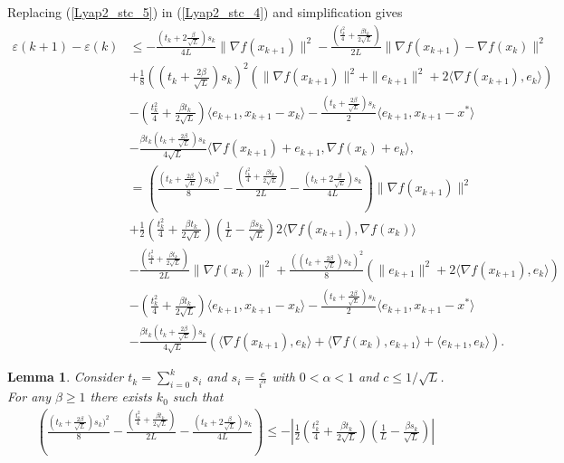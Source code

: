 \documentclass{article}
\theoremstyle{plain}
\newtheorem{lem}{\textbf{Lemma}}
\theoremstyle{definition}
\theoremstyle{remark}
\begin{document}
        Replacing (\ref{Lyap2_stc_5}) in (\ref{Lyap2_stc_4}) and simplification gives
        \begin{align}\label{Lyap2_stc_6}
            \varepsilon(k+1)-\varepsilon(k)&\leq -\frac{(t_k+2\frac{\beta}{\sqrt{L}})s_k}{4L} \|\nabla f(x_{k+1})\|^2-\frac{(\frac{t_{k}^2}{4}+\frac{\beta t_{k}}{2\sqrt{L}})}{2L}\|\nabla f(x_{k+1})-\nabla f(x_k)\|^2\nonumber\\
            &+\frac{1}{8}((t_k+\frac{2\beta}{\sqrt{L}})s_k)^2(\|\nabla f(x_{k+1})\|^2+\|e_{k+1}\|^2+2\langle \nabla f(x_{k+1}) ,e_k \rangle) \nonumber\\
            & -(\frac{t_k^2}{4}+\frac{\beta t_k}{2\sqrt{L}})\langle e_{k+1},x_{k+1}-x_k\rangle-\frac{(t_k+\tfrac{2\beta}{\sqrt{L}})s_k}{2}\langle e_{k+1},x_{k+1}-x^*\rangle\nonumber\\
         & -\frac{\beta t_k(t_k+\frac{2\beta}{\sqrt{L}})s_k}{4\sqrt{L}}\langle \nabla f(x_{k+1})+e_{k+1}, \nabla f(x_k)+e_k \rangle,\nonumber\\
         &=\left( \frac{(t_k+\frac{2\beta}{\sqrt{L}})s_k)^2}{8}- \frac{(\frac{t_{k}^2}{4}+\frac{\beta t_{k}}{2\sqrt{L}})}{2L}- \frac{(t_k+2\frac{\beta}{\sqrt{L}})s_k}{4L}\right)\|\nabla f(x_{k+1})\|^2\nonumber\\
         &+\frac{1}{2}\left(\frac{t_k^2}{4}+\frac{\beta t_k}{2\sqrt{L}} \right)(\frac{1}{L}-\frac{\beta s_k}{\sqrt{L}}) 2\langle \nabla f(x_{k+1}),\nabla f(x_k) \rangle\nonumber\\
         &-\frac{(\frac{t_{k}^2}{4}+\frac{\beta t_{k}}{2\sqrt{L}})}{2L}\|\nabla f(x_k)\|^2+\frac{((t_k+\frac{2\beta}{\sqrt{L}})s_k)^2}{8}(\|e_{k+1}\|^2+2\langle \nabla f(x_{k+1}) ,e_k \rangle)\nonumber\\
         & -(\frac{t_k^2}{4}+\frac{\beta t_k}{2\sqrt{L}})\langle e_{k+1},x_{k+1}-x_k\rangle-\frac{(t_k+\tfrac{2\beta}{\sqrt{L}})s_k}{2}\langle e_{k+1},x_{k+1}-x^*\rangle\nonumber\\
         &-\frac{\beta t_k(t_k+\frac{2\beta}{\sqrt{L}})s_k}{4\sqrt{L}}\left(\langle \nabla f(x_{k+1}),e_k \rangle+\langle \nabla f(x_{k}) , e_{k+1}\rangle+\langle e_{k+1},e_k\rangle\right).
        \end{align}
        \begin{lem}\label{lem1}
            Consider $t_k=\sum_{i=0}^k s_i$ and $s_i=\frac{c}{i^{\alpha}}$ with $0<\alpha<1$ and $c\leq 1/\sqrt{L}$. For any $\beta\geq 1$ there exists $k_0$ such that 
            \begin{align}\label{lem1_eqn1}
                \left( \frac{(t_k+\frac{2\beta}{\sqrt{L}})s_k)^2}{8}- \frac{(\frac{t_{k}^2}{4}+\frac{\beta t_{k}}{2\sqrt{L}})}{2L}- \frac{(t_k+2\frac{\beta}{\sqrt{L}})s_k}{4L}\right)\leq -\left|\frac{1}{2}\left(\frac{t_k^2}{4}+\frac{\beta t_k}{2\sqrt{L}} \right)(\frac{1}{L}-\frac{\beta s_k}{\sqrt{L}})\right|
            \end{align}
        \end{lem}
\end{document}
